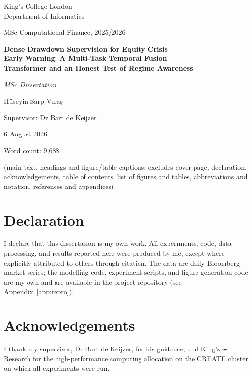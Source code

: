 \documentclass[11pt,a4paper]{article}
\begin{document}
\begin{titlepage}
\centering
\vspace*{2.2cm}
{\large King's College London \\ Department of Informatics \par}
\vspace{0.4cm}
{\large MSc Computational Finance, 2025/2026 \par}
\vfill
{\Large\bfseries Dense Drawdown Supervision for Equity Crisis\\[4pt]
Early Warning: A Multi-Task Temporal Fusion\\[4pt]
Transformer and an Honest Test of Regime Awareness \par}
\vspace{0.8cm}
{\itshape MSc Dissertation \par}
\vfill
{\large H\"useyin Sarp Vula\c{s} \par}
\vspace{0.2cm}
{\normalsize Supervisor: Dr Bart de Keijzer \par}
\vfill
{\normalsize 6 August 2026 \par}
\vspace{0.9cm}
{\normalsize Word count: 9{,}688 \par}
{\footnotesize (main text, headings and figure/table captions; excludes cover
page, declaration, acknowledgements, table of contents, list of figures and
tables, abbreviations and notation, references and appendices) \par}
\vspace{1cm}
\end{titlepage}

\section*{Declaration}
\noindent
I declare that this dissertation is my own work. All experiments, code, data
processing, and results reported here were produced by me, except where
explicitly attributed to others through citation. The data are daily Bloomberg
market series; the modelling code, experiment scripts, and figure-generation
code are my own and are available in the project repository (see
Appendix~\ref{app:repro}).

\section*{Acknowledgements}
\noindent
I thank my supervisor, Dr Bart de Keijzer, for his guidance, and King's
e-Research for the high-performance computing allocation on the CREATE cluster
on which all experiments were run.
\end{document}
